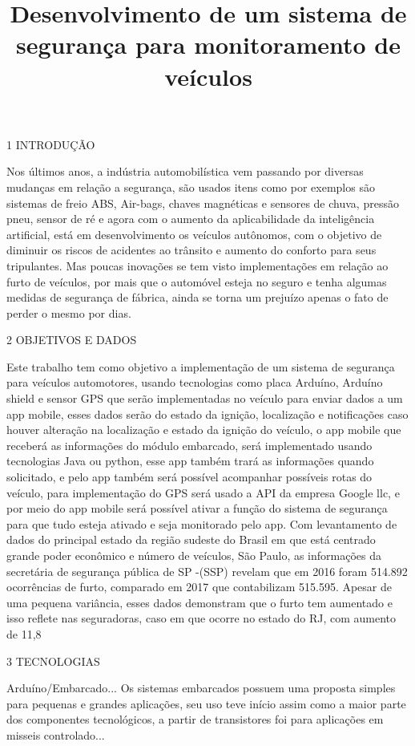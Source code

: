 \documentclass[12pt,a4paper]{article}
\title{Desenvolvimento de um sistema de segurança para monitoramento de veículos}
\begin{document}
1 INTRODUÇÃO
 
	Nos últimos anos, a indústria automobilística vem passando por diversas mudanças em relação a segurança, são usados itens como por exemplos são sistemas de freio ABS, Air-bags, chaves magnéticas e sensores de chuva, pressão pneu, sensor de ré e agora com o aumento da aplicabilidade da inteligência artificial, está em desenvolvimento os veículos autônomos, com o objetivo de diminuir os riscos de acidentes ao trânsito e aumento do conforto para seus tripulantes. Mas poucas inovações se tem visto implementações em relação ao furto de veículos, por mais que o automóvel esteja no seguro e tenha algumas medidas de segurança de fábrica, ainda se torna um prejuízo apenas o fato de perder o mesmo por dias.

2 OBJETIVOS E DADOS

	Este trabalho tem como objetivo a implementação de um sistema de segurança para veículos automotores, usando tecnologias como placa Arduíno, Arduíno shield e sensor GPS que serão implementadas no veículo para enviar dados a um app mobile, esses dados serão do estado da ignição, localização e notificações caso houver alteração na localização e estado da ignição do veículo, o app mobile que receberá as informações do módulo embarcado, será implementado usando tecnologias Java ou python, esse app também trará as informações quando solicitado, e pelo app também será possível acompanhar possíveis rotas do veículo, para implementação do GPS será usado a API da empresa Google llc, e por meio do app mobile será possível ativar a função do sistema de segurança para que tudo esteja ativado e seja monitorado pelo app.
	Com levantamento de dados do principal estado da região sudeste do Brasil em que está centrado grande poder econômico e número de veículos, São Paulo, as informações da secretária de segurança pública de SP -(SSP) revelam que em 2016 foram 514.892 ocorrências de furto, comparado em 2017 que contabilizam 515.595. Apesar de uma pequena variância, esses dados demonstram que o furto tem aumentado e isso reflete nas seguradoras, caso em que ocorre no estado do RJ, com aumento de 11,8%

3 TECNOLOGIAS

Arduíno/Embarcado...
	Os sistemas embarcados possuem uma proposta simples para pequenas e grandes aplicações, seu uso teve início assim como a maior parte dos componentes tecnológicos, a partir de transistores foi para aplicações em misseis controlado...
	
\end{document}
